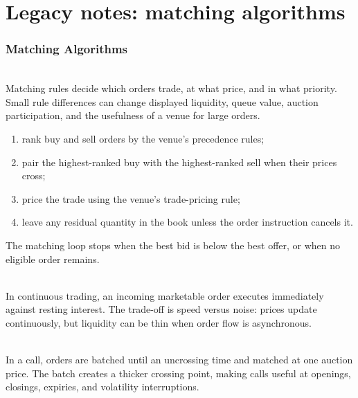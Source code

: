 \documentclass[a4paper,oneside,openany]{book}
\begin{document}
\chapter*{Legacy notes: matching algorithms}

\subsection*{Matching Algorithms}

\begin{principle} \\
Matching rules decide which orders trade, at what price, and in what priority. Small rule differences can change displayed liquidity, queue value, auction participation, and the usefulness of a venue for large orders.
\end{principle}

\begin{process} 
\begin{enumerate}[label=\roman*.]
\setlength{\itemsep}{0pt}
\item rank buy and sell orders by the venue's precedence rules;
\item pair the highest-ranked buy with the highest-ranked sell when their prices cross;
\item price the trade using the venue's trade-pricing rule;
\item leave any residual quantity in the book unless the order instruction cancels it.
\end{enumerate}
The matching loop stops when the best bid is below the best offer, or when no eligible order remains.
\end{process}

\begin{mechanism} \\
In continuous trading, an incoming marketable order executes immediately against resting interest. The trade-off is speed versus noise: prices update continuously, but liquidity can be thin when order flow is asynchronous.
\end{mechanism}

\begin{mechanism} \\
In a call, orders are batched until an uncrossing time and matched at one auction price. The batch creates a thicker crossing point, making calls useful at openings, closings, expiries, and volatility interruptions.
\end{mechanism}
\end{document}
